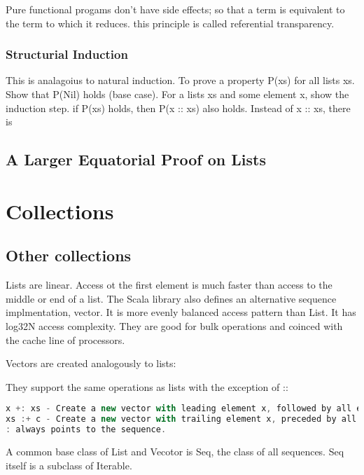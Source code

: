 \documentclass[10pt, a4paper]{report}
\begin{document}
 Pure functional progams don't have side effects; so that a term is equivalent to the term to which it reduces. this principle is called referential transparency.
 
 \subsection{Structurial Induction}
 
 This is analagoius to natural induction. To prove a property P(xs) for all lists xs. Show that P(Nil) holds (base case). For a lists xs and some element x, show the induction step. if P(xs) holds, then P(x :: xs) also holds. Instead of x :: xs, there is

\section{A Larger Equatorial Proof on Lists}

\chapter{Collections}

\section{Other collections}

Lists are linear. Access ot the first element is much faster than access to the middle or end of a list. The Scala library also defines an alternative sequence implmentation, vector. It is more evenly balanced access pattern than List. It has log32N access complexity. They are good for bulk operations and coinced with the cache line of processors.

Vectors are created analogously to lists:

They support the same operations as lists with the exception of ::

\begin{lstlisting}[language=scala]
x +: xs - Create a new vector with leading element x, followed by all elements xs
xs :+ c - Create a new vector with trailing element x, preceded by all elements of xs.
: always points to the sequence.

\end{lstlisting}

A common base class of List and Vecotor is Seq, the class of all sequences. Seq itself is a subclass of Iterable.\\
\end{document}
